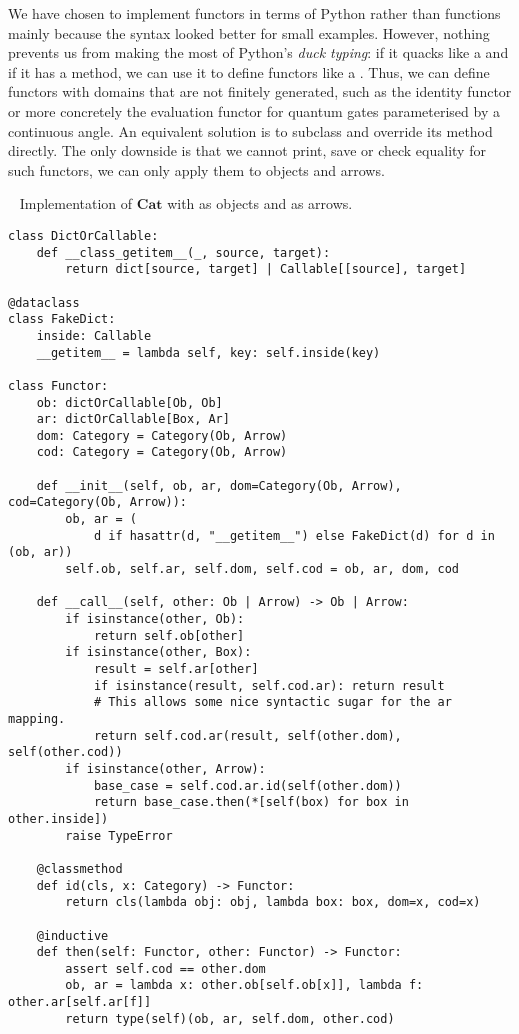We have chosen to implement functors in terms of Python  rather than functions mainly because the syntax looked better for small examples.
However, nothing prevents us from making the most of Python's \emph{duck typing}: if it quacks like a  and if it has a  method, we can use it to define functors like a .
Thus, we can define functors with domains that are not finitely generated, such as the identity functor or more concretely the evaluation functor for quantum gates parameterised by a continuous angle.
An equivalent solution is to subclass  and override its  method directly.
The only downside is that we cannot print, save or check equality for such functors, we can only apply them to objects and arrows.

\begin{python}~\label{listing:Functor}
{\normalfont Implementation of $\mathbf{Cat}$ with  as objects and  as arrows.}

\begin{verbatim}
class DictOrCallable:
    def __class_getitem__(_, source, target):
        return dict[source, target] | Callable[[source], target]

@dataclass
class FakeDict:
    inside: Callable
    __getitem__ = lambda self, key: self.inside(key)

class Functor:
    ob: dictOrCallable[Ob, Ob]
    ar: dictOrCallable[Box, Ar]
    dom: Category = Category(Ob, Arrow)
    cod: Category = Category(Ob, Arrow)

    def __init__(self, ob, ar, dom=Category(Ob, Arrow), cod=Category(Ob, Arrow)):
        ob, ar = (
            d if hasattr(d, "__getitem__") else FakeDict(d) for d in (ob, ar))
        self.ob, self.ar, self.dom, self.cod = ob, ar, dom, cod

    def __call__(self, other: Ob | Arrow) -> Ob | Arrow:
        if isinstance(other, Ob):
            return self.ob[other]
        if isinstance(other, Box):
            result = self.ar[other]
            if isinstance(result, self.cod.ar): return result
            # This allows some nice syntactic sugar for the ar mapping.
            return self.cod.ar(result, self(other.dom), self(other.cod))
        if isinstance(other, Arrow):
            base_case = self.cod.ar.id(self(other.dom))
            return base_case.then(*[self(box) for box in other.inside])
        raise TypeError

    @classmethod
    def id(cls, x: Category) -> Functor:
        return cls(lambda obj: obj, lambda box: box, dom=x, cod=x)

    @inductive
    def then(self: Functor, other: Functor) -> Functor:
        assert self.cod == other.dom
        ob, ar = lambda x: other.ob[self.ob[x]], lambda f: other.ar[self.ar[f]]
        return type(self)(ob, ar, self.dom, other.cod)
\end{verbatim}
\end{python}

